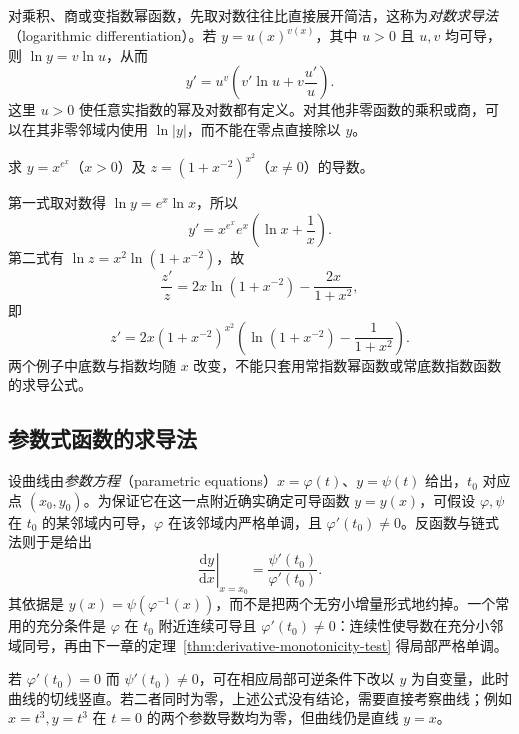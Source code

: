 对乘积、商或变指数幂函数，先取对数往往比直接展开简洁，这称为\emph{对数求导法}（logarithmic differentiation）。若 $y=u(x)^{v(x)}$，其中 $u>0$ 且 $u,v$ 均可导，则 $\ln y=v\ln u$，从而
\begin{equation}
\label{eq:logarithmic-differentiation-variable-power}
    y'=u^v\left(v'\ln u+v\frac{u'}u\right).
\end{equation}
这里 $u>0$ 使任意实指数的幂及对数都有定义。对其他非零函数的乘积或商，可以在其非零邻域内使用 $\ln|y|$，而不能在零点直接除以 $y$。

\begin{example}
\label{ex:logarithmic-differentiation-examples}
求 $y=x^{e^x}$（$x>0$）及 $z=(1+x^{-2})^{x^2}$（$x\ne0$）的导数。
\end{example}
\begin{solve}
第一式取对数得 $\ln y=e^x\ln x$，所以
\[
    y'=x^{e^x}e^x\left(\ln x+\frac1x\right).
\]
第二式有 $\ln z=x^2\ln(1+x^{-2})$，故
\[
    \frac{z'}z
    =2x\ln(1+x^{-2})-\frac{2x}{1+x^2},
\]
即
\[
    z'=2x(1+x^{-2})^{x^2}
    \left(\ln(1+x^{-2})-\frac1{1+x^2}\right).
\]
两个例子中底数与指数均随 $x$ 改变，不能只套用常指数幂函数或常底数指数函数的求导公式。
\end{solve}

\subsection{参数式函数的求导法}
\label{subsec:parametric-differentiation}

设曲线由\emph{参数方程}（parametric equations）$x=\varphi(t)$、$y=\psi(t)$ 给出，$t_0$ 对应点 $(x_0,y_0)$。为保证它在这一点附近确实确定可导函数 $y=y(x)$，可假设 $\varphi,\psi$ 在 $t_0$ 的某邻域内可导，$\varphi$ 在该邻域内严格单调，且 $\varphi'(t_0)\ne0$。反函数与链式法则于是给出
\begin{equation}
\label{eq:parametric-first-derivative}
    \left.\frac{\mathrm dy}{\mathrm dx}\right|_{x=x_0}
    =\frac{\psi'(t_0)}{\varphi'(t_0)}.
\end{equation}
其依据是 $y(x)=\psi(\varphi^{-1}(x))$，而不是把两个无穷小增量形式地约掉。一个常用的充分条件是 $\varphi$ 在 $t_0$ 附近连续可导且 $\varphi'(t_0)\ne0$：连续性使导数在充分小邻域同号，再由下一章的定理~\ref{thm:derivative-monotonicity-test} 得局部严格单调。

若 $\varphi'(t_0)=0$ 而 $\psi'(t_0)\ne0$，可在相应局部可逆条件下改以 $y$ 为自变量，此时曲线的切线竖直。若二者同时为零，上述公式没有结论，需要直接考察曲线；例如 $x=t^3,y=t^3$ 在 $t=0$ 的两个参数导数均为零，但曲线仍是直线 $y=x$。

